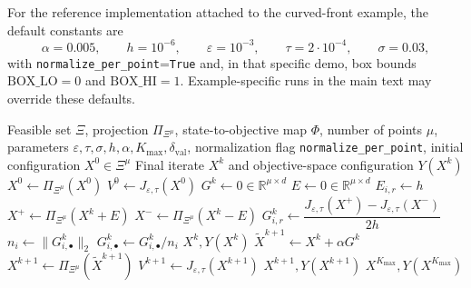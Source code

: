 \documentclass{article}
\begin{document}
For the reference implementation attached to the curved-front example, the default constants are
\[
\alpha=0.005,\qquad h=10^{-6},\qquad \varepsilon=10^{-3},\qquad \tau=2\cdot 10^{-4},\qquad \sigma=0.03,
\]
with \texttt{normalize\_per\_point}=\texttt{True} and, in that specific demo, box bounds $\mathrm{BOX\_LO}=0$ and $\mathrm{BOX\_HI}=1$. Example-specific runs in the main text may override these defaults.

\begin{algorithm}[htbp]
\caption{Projected set-gradient ascent for a layered indicator surrogate}
\label{alg:layered-projected-fd}
\begin{algorithmic}[1]
\Require Feasible set $\Xi$, projection $\Pi_{\Xi^{\mu}}$, state-to-objective map $\Phi$, number of points $\mu$, parameters $\varepsilon,\tau,\sigma,h,\alpha,K_{\max},\delta_{\mathrm{val}}$, normalization flag \texttt{normalize\_per\_point}, initial configuration $X^{0}\in \Xi^{\mu}$
\Ensure Final iterate $X^{k}$ and objective-space configuration $Y(X^{k})$
\State $X^{0} \gets \Pi_{\Xi^{\mu}}(X^{0})$ 
\State $V^{0} \gets J_{\varepsilon,\tau}(X^{0})$
    \State $G^{k} \gets 0 \in \mathbb{R}^{\mu\times d}$
            \State $E \gets 0 \in \mathbb{R}^{\mu\times d}$
            \State $E_{i,r} \gets h$ 
            \State $X^{+} \gets \Pi_{\Xi^{\mu}}(X^{k}+E)$
            \State $X^{-} \gets \Pi_{\Xi^{\mu}}(X^{k}-E)$
            \State $G^{k}_{i,r} \gets \dfrac{J_{\varepsilon,\tau}(X^{+})-J_{\varepsilon,\tau}(X^{-})}{2h}$
        \EndFor
    \EndFor
            \State $n_i \gets \lVert G^{k}_{i,\bullet}\rVert_2$
                \State $G^{k}_{i,\bullet} \gets G^{k}_{i,\bullet}/n_i$ 
            \EndIf
        \EndFor
    \EndIf
        \State \Return $X^{k},Y(X^{k})$ 
    \EndIf
    \State $\widetilde X^{k+1} \gets X^{k}+\alpha G^{k}$
    \State $X^{k+1} \gets \Pi_{\Xi^{\mu}}(\widetilde X^{k+1})$ 
    \State $V^{k+1} \gets J_{\varepsilon,\tau}(X^{k+1})$
        \State \Return $X^{k+1},Y(X^{k+1})$ 
    \EndIf
\EndFor
\State \Return $X^{K_{\max}},Y(X^{K_{\max}})$
\end{algorithmic}
\end{algorithm}
\end{document}
